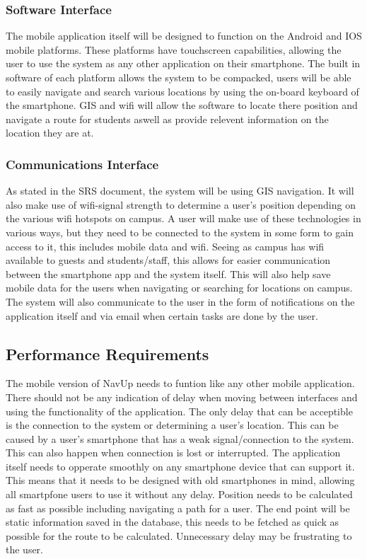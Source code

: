 \documentclass{article}
\begin{document}
		\subsubsection{Software Interface}
The mobile application itself will be designed to function on the Android and IOS mobile platforms. These platforms have touchscreen capabilities, allowing the user to use the system as any other application on their smartphone. The built in software of each platform allows the system to be compacked, users will be able to easily navigate and search various locations by using the on-board keyboard of the smartphone. GIS and wifi will allow the software to locate there position and navigate a route for students aswell as provide relevent information on the location they are at.

		\subsubsection{Communications Interface}
As stated in the SRS document, the system will be using GIS navigation. It will also make use of wifi-signal strength to determine a user's position depending on the various wifi hotspots on campus. A user will make use of these technologies in various ways, but they need to be connected to the system in some form to gain access to it, this includes mobile data and wifi. Seeing as campus has wifi available to guests and students/staff, this allows for easier communication between the smartphone app and the system itself. This will also help save mobile data for the users when navigating or searching for locations on campus. The system will also communicate to the user in the form of notifications on the application itself and via email when certain tasks are done by the user.
	\subsection{Performance Requirements}
The mobile version of NavUp needs to funtion like any other mobile application. There should not be any indication of delay when moving between interfaces and using the functionality of the application. The only delay that can be acceptible is the connection to the system or determining a user's location. This can be caused by a user's smartphone that has a weak signal/connection to the system. This can also happen when connection is lost or interrupted. The application itself needs to opperate smoothly on any smartphone device that can support it. This means that it needs to be designed with old smartphones in mind, allowing all smartpfone users to use it without any delay. Position needs to be calculated as fast as possible including navigating a path for a user. The end point will be static information saved in the database, this needs to be fetched as quick as possible for the route to be calculated. Unnecessary delay may be frustrating to the user.	
\end{document}
